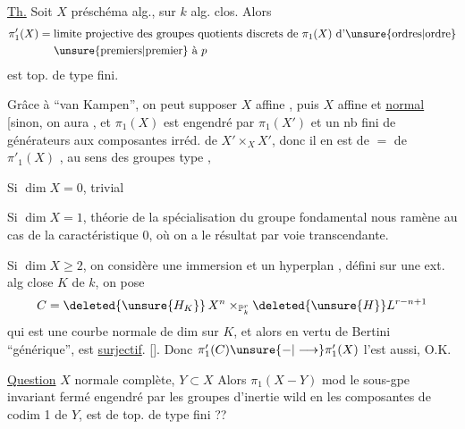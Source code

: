 
\uline{Th.} Soit $X$ préschéma alg., sur $k$ alg. clos. Alors
\[
\begin{aligned}
\pi'_1(X)={}&\text{limite projective des groupes quotients discrets de }\pi_1(X)\text{ d'\unsure{ordres|ordre}}\\
&\text{\unsure{premiers|premier} à }p
\end{aligned}
\]
est top. de type fini.

Grâce à ``van Kampen'', on peut supposer $X$ affine , puis $X$ affine et \uline{normal} [sinon, on aura
, et $\pi_1(X)$ est engendré par $\pi_1(X')$ et un nb fini de générateurs  aux composantes irréd. de $X'\times_X X'$, donc il en est de $=$ de $\pi'_1(X)$ , au  sens des groupes  type , 

Si $\dim X=0$, trivial

Si $\dim X=1$, théorie de la spécialisation du groupe fondamental  nous ramène au cas de la caractéristique $0$, où on a  le  résultat par voie transcendante.

Si $\dim X\geq 2$, on considère une immersion
et un hyperplan  , défini sur une ext. alg close $K$ de $k$, on pose
\[
 C=\deleted{\unsure{H_{K}}}\,X^n\times_{\mathbb P_k^r}\deleted{\unsure{H}}L^{r-n+1}
\]
qui est une courbe normale de dim  sur $K$, et alors en vertu de Bertini ``générique'',
est \uline{surjectif}. []. Donc $\pi'_1(C)\unsure{-|\longrightarrow}\pi'_1(X)$ l'est aussi, O.K.

\uline{Question} $X$ normale complète, $Y\subset X$  Alors $\pi_1(X-Y)$ mod le sous-gpe invariant fermé engendré par les groupes d'inertie wild en les composantes de  codim 1 de $Y$, est de top. de type fini ??
